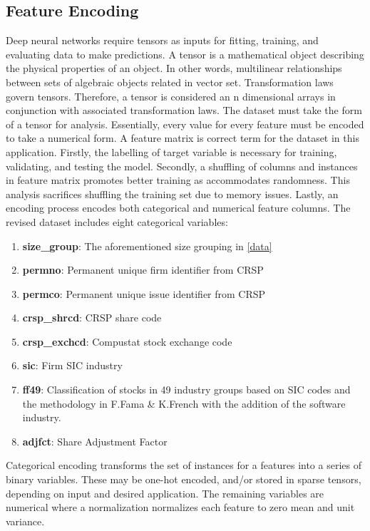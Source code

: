 \documentclass[10pt]{article}
\begin{document}
\subsection{Feature Encoding}
Deep neural networks require tensors as inputs for fitting, training, and evaluating data to make predictions.
A tensor is a mathematical object describing the physical properties of an object. In other words, multilinear relationships between sets of algebraic objects related in vector set.
Transformation laws govern tensors. Therefore, a tensor is considered an n dimensional arrays in conjunction with associated transformation laws.
The dataset must take the form of a tensor for analysis.
Essentially, every value for every feature must be encoded to take a numerical form.
A feature matrix is correct term for the dataset in this application.
Firstly, the labelling of target variable is necessary for training, validating, and testing the model.
Secondly, a shuffling of columns and instances in feature matrix promotes better training as accommodates randomness.
This analysis sacrifices shuffling the training set due to memory issues.
Lastly, an encoding process encodes both categorical and numerical feature columns.
The revised dataset includes eight categorical variables:
\begin{enumerate}
	\item \textbf{size\_group}: The aforementioned size grouping in \ref{data}
	\item \textbf{permno}: Permanent unique firm identifier from CRSP
	\item \textbf{permco}: Permanent unique issue identifier from CRSP
	\item \textbf{crsp\_shrcd}: CRSP share code
	\item \textbf{crsp\_exchcd}: Compustat stock exchange code
	\item \textbf{sic}: Firm SIC industry
	\item \textbf{ff49}: Classification of stocks in 49 industry groups based on SIC codes and the methodology in F.Fama \& K.French \citeyear{fama1997industry} with the addition of the software industry.
	\item \textbf{adjfct}: Share Adjustment Factor
\end{enumerate}
Categorical encoding transforms the set of instances for a features into a series of binary variables.
These may be one-hot encoded, and/or stored in sparse tensors, depending on input and desired application.
The remaining variables are numerical where a normalization normalizes each feature to zero mean and unit variance.
\end{document}
